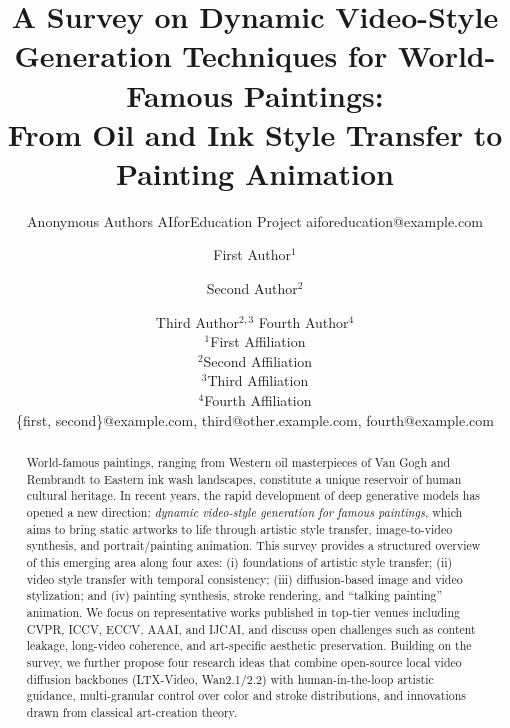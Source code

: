 \documentclass{article}
\title{A Survey on Dynamic Video-Style Generation Techniques for World-Famous Paintings:\\
From Oil and Ink Style Transfer to Painting Animation}
\author{
    Anonymous Authors
    \affiliations
    AIforEducation Project
    \emails
    aiforeducation@example.com
}
\author{
First Author$^1$
\and
Second Author$^2$\and
Third Author$^{2,3}$\And
Fourth Author$^4$\\
\affiliations
$^1$First Affiliation\\
$^2$Second Affiliation\\
$^3$Third Affiliation\\
$^4$Fourth Affiliation\\
\emails
\{first, second\}@example.com,
third@other.example.com,
fourth@example.com
}
\begin{document}
\maketitle

\begin{abstract}
World-famous paintings, ranging from Western oil masterpieces of Van Gogh and Rembrandt
to Eastern ink wash landscapes, constitute a unique reservoir of human cultural heritage.
In recent years, the rapid development of deep generative models has opened a new direction:
\emph{dynamic video-style generation for famous paintings}, which aims to bring static
artworks to life through artistic style transfer, image-to-video synthesis, and
portrait/painting animation. This survey provides a structured overview of this emerging
area along four axes: (i) foundations of artistic style transfer; (ii) video style
transfer with temporal consistency; (iii) diffusion-based image and video stylization;
and (iv) painting synthesis, stroke rendering, and ``talking painting'' animation.
We focus on representative works published in top-tier venues including CVPR, ICCV,
ECCV, AAAI, and IJCAI, and discuss open challenges such as content leakage, long-video
coherence, and art-specific aesthetic preservation. Building on the survey, we further
propose four research ideas that combine open-source local video diffusion backbones
(LTX-Video, Wan2.1/2.2) with human-in-the-loop artistic guidance, multi-granular control
over color and stroke distributions, and innovations drawn from classical art-creation
theory.
\end{abstract}
















\end{document}
